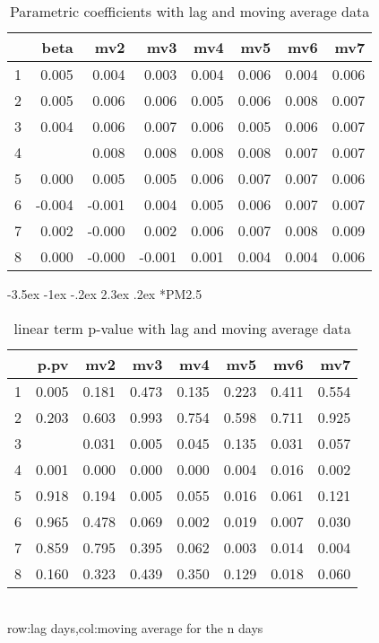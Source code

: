 \documentclass[a4paper, 12pt]{article}
\makeatletter
\def\large{\fontsize{14}{20}\selectfont}
\renewcommand\subsection{\@startsection {subsection}{1}{\z@}%
                                   {-3.5ex \@plus -1ex \@minus -.2ex}%
                                   {2.3ex \@plus.2ex}%
                                   {\centering\normalfont\large\bfseries}}
\makeatother
\begin{document}
\begin{table}[h]
\centering
\caption{Parametric coefficients with lag and moving average data}
\begin{tabular}{rrrrrrrr}
  \hline
 & beta & mv2 & mv3 & mv4 & mv5 & mv6 & mv7 \\
  \hline
1 & 0.005 & 0.004 & 0.003 & 0.004 & 0.006 & 0.004 & 0.006 \\
  2 & 0.005 & 0.006 & 0.006 & 0.005 & 0.006 & 0.008 & 0.007 \\
  3 & 0.004 & 0.006 & 0.007 & 0.006 & 0.005 & 0.006 & 0.007 \\
  4 & \color{red}{0.009} & 0.008 & 0.008 & 0.008 & 0.008 & 0.007 & 0.007 \\
  5 & 0.000 & 0.005 & 0.005 & 0.006 & 0.007 & 0.007 & 0.006 \\
  6 & -0.004 & -0.001 & 0.004 & 0.005 & 0.006 & 0.007 & 0.007 \\
  7 & 0.002 & -0.000 & 0.002 & 0.006 & 0.007 & 0.008 & 0.009 \\
  8 & 0.000 & -0.000 & -0.001 & 0.001 & 0.004 & 0.004 & 0.006 \\
   \hline
\end{tabular}
\end{table}
\clearpage
\subsection*{PM2.5}
\begin{table}[h]
\centering
\caption{linear term p-value with lag and moving average data}
\begin{tabular}{rrrrrrrr}
  \hline
 & p.pv & mv2 & mv3 & mv4 & mv5 & mv6 & mv7 \\
  \hline
1 & 0.005 & 0.181 & 0.473 & 0.135 & 0.223 & 0.411 & 0.554 \\
  2 & 0.203 & 0.603 & 0.993 & 0.754 & 0.598 & 0.711 & 0.925 \\
  3 & \color{red}{0.000} & 0.031 & 0.005 & 0.045 & 0.135 & 0.031 & 0.057 \\
  4 &0.001 & 0.000 & 0.000 & 0.000 & 0.004 & 0.016 & 0.002 \\
  5 & 0.918 & 0.194 & 0.005 & 0.055 & 0.016 & 0.061 & 0.121 \\
  6 & 0.965 & 0.478 & 0.069 & 0.002 & 0.019 & 0.007 & 0.030 \\
  7 & 0.859 & 0.795 & 0.395 & 0.062 & 0.003 & 0.014 & 0.004 \\
  8 & 0.160 & 0.323 & 0.439 & 0.350 & 0.129 & 0.018 & 0.060 \\
   \hline
\end{tabular}
\\row:lag days,col:moving average for the n days
\end{table}
\end{document}
